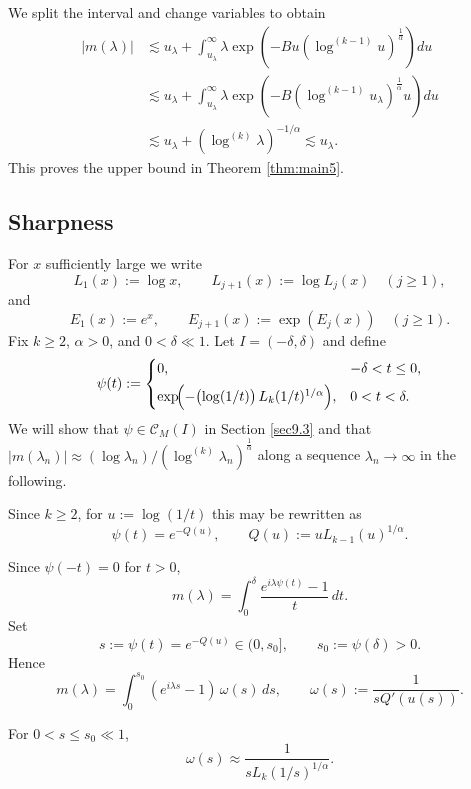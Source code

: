 \documentclass[11pt]{amsart}
\newcommand{\la}{\lambda}
\newcommand{\ls}{\lesssim}
\newcommand{\1}{{\rm 1\hspace*{-0.4ex}%
			\rule{0.1ex}{1.52ex}\hspace*{0.2ex}}}
\numberwithin{equation}{section}
\begin{document}
We split the interval and change variables to obtain
\begin{align*}
	|m(\la)|
	&\ls u_\la+ \int_{u_\la}^\infty \la \exp(-B u(\log^{(k-1)}u)^{\frac1\alpha})du\\
	&\ls u_\la+\int_{u_\la}^\infty \la\exp(-B(\log^{(k-1)}u_\la)^{\frac1\alpha}u)du\\
	&\ls u_\la+(\log^{(k)}\la)^{-1/\alpha}\ls u_\la.
\end{align*}
This proves the upper bound in Theorem \ref{thm:main5}.

\subsection{Sharpness}\label{8sharp}
 For $x$ sufficiently large we write
\[
L_1(x):=\log x,
\qquad
L_{j+1}(x):=\log L_j(x)\quad (j\ge 1),
\]
and
\[
E_1(x):=e^x,
\qquad
E_{j+1}(x):=\exp(E_j(x))\quad (j\ge 1).
\]
Fix $k\ge 2$, $\alpha>0$, and $0<\delta\ll1$.
Let $I=(-\delta,\delta)$ and define
\[
\psi(t):=
\begin{cases}
	0, & -\delta<t\le 0,\\[4pt]
	\exp\!\Bigl(-\bigl(\log(1/t)\bigr)\,L_k(1/t)^{1/\alpha}\Bigr), & 0<t<\delta.
\end{cases}
\]
We will show that $\psi\in \mathcal{C}_M(I)$ in Section \ref{sec9.3} 
and that $|m(\lambda_n)| \approx (\log\la_n)/(\log^{(k)}\la_n)^{\frac1\alpha}$
along a sequence $\lambda_n\to\infty$ in the following.

Since $k\ge 2$, for $u:=\log(1/t)$ this may be rewritten as
\[
\psi(t)=e^{-Q(u)},
\qquad
Q(u):=uL_{k-1}(u)^{1/\alpha}.
\]


Since $\psi(-t)=0$ for $t>0$,
\[
m(\lambda)=\int_0^{\delta}\frac{e^{i\lambda\psi(t)}-1}{t}\,dt.
\]
Set
\[
s:=\psi(t)=e^{-Q(u)}\in (0,s_0],
\qquad
s_0:=\psi(\delta)>0.
\]
Hence
\begin{equation}
	\label{eq:m-omega}
	m(\lambda)=\int_0^{s_0}(e^{i\lambda s}-1)\,\omega(s)\,ds,
	\qquad
	\omega(s):=\frac{1}{sQ'(u(s))}.
\end{equation}


For $0<s\le s_0\ll1$, 
\begin{equation}
	\label{eq:weight-comparison}
\omega(s)\approx 
	\frac{1}{sL_k(1/s)^{1/\alpha}}.
\end{equation}
\end{document}
